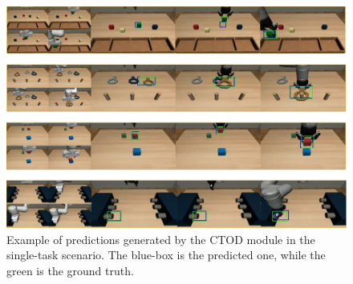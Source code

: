 \begin{figure}[t]
    \centering
    \includegraphics[width=1.0\textwidth]{figures/images/ch2/example_of_prediction_ctod_single.jpg}
    \caption{Example of predictions generated by the CTOD module in the single-task scenario. The blue-box is the predicted one, while the green is the ground truth.}
    \label{fig:ctod_example_of_prediction}
\end{figure}
